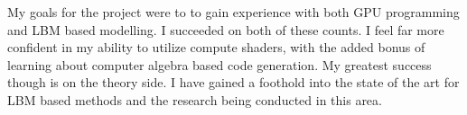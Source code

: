 My goals for the project were to to gain experience 
with both GPU programming and 
LBM based modelling.
I succeeded on both of these counts.
I feel far more confident in my ability to utilize compute shaders,
with the added bonus of learning about computer algebra based
code generation.
My greatest success though is on the theory side.
I have gained a foothold into
the state of the art for LBM based methods and
the research being conducted in this area.
